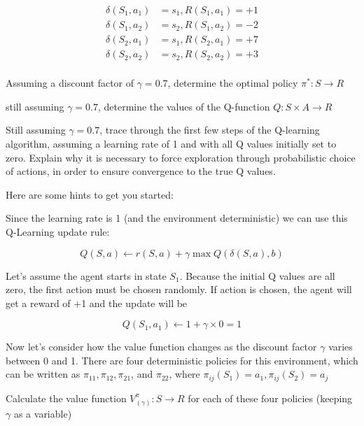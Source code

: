 \documentclass[11pt]{article}
\begin{document}
\[
\begin{aligned}
    \delta (S_1, a_1) &= s_1, R(S_1, a_1) = +1 \\
    \delta (S_1, a_2) &= s_2, R(S_1, a_2) = -2 \\
    \delta (S_2, a_1) &= s_1, R(S_2, a_1) = +7 \\
    \delta (S_2, a_2) &= s_2, R(S_2, a_2) = +3 \\
\end{aligned}
\]

Assuming a discount factor of $\gamma = 0.7$, determine the optimal policy
$\pi^* : S \to R$


still assuming $\gamma = 0.7$, determine the values of the Q-function
$Q: S \times A \to R$


Still assuming $\gamma = 0.7$, trace through the first few steps of the
Q-learning algorithm, assuming a learning rate of 1 and with all Q values
initially set to zero.
Explain why it is necessary to force exploration through probabilistic choice
of actions, in order to ensure convergence to the true Q values.

Here are some hints to get you started:

Since the learning rate is 1 (and the environment deterministic) we can use
this Q-Learning update rule:

\[Q(S,a) \leftarrow r(S,a) + \gamma \max Q(\delta(S,a),b)\]

Let's assume the agent starts in state $S_1$.
Because the initial Q values are all zero, the first action must be chosen randomly.
If action  is chosen, the agent will get a reward of +1 and the update will be

\[Q(S_1, a_1) \leftarrow 1 + \gamma \times 0 = 1\]


Now let's consider how the value function changes as the discount factor $\gamma$
varies between 0 and 1.
There are four deterministic policies for this environment, which can be
written as $\pi_{11}, \pi_{12}, \pi_{21}$, and $\pi_{22}$, where
$\pi_{ij} (S_1) = a_1, \pi_{ij}(S_2) = a_j$

Calculate the value function $V_{(\gamma)}^{\pi}: S \to R$ for each of these
four policies (keeping $\gamma$ as a variable)

\end{document}

